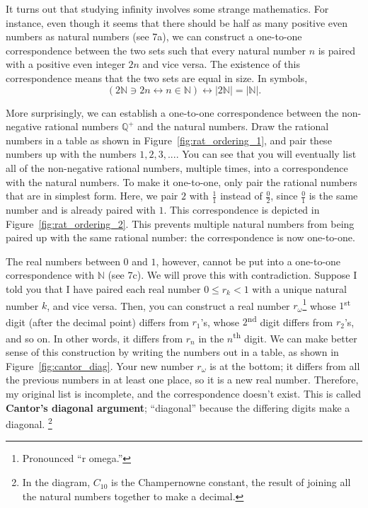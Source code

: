 \documentclass[../gatm.tex]{subfiles}
\begin{document}
It turns out that studying infinity involves some strange mathematics. For instance, even though it seems that there should be half as many positive even numbers as natural numbers (see 7a), we can construct a one-to-one correspondence between the two sets such that every natural number $n$ is paired with a positive even integer $2n$ and vice versa. The existence of this correspondence means that the two sets are equal in size. In symbols, $$(2\mathbb{N} \ni 2n \leftrightarrow n \in \mathbb{N}) \leftrightarrow |2\mathbb{N}|=|\mathbb{N}|.$$ %

More surprisingly, we can establish a one-to-one correspondence between the non-negative rational numbers $\mathbb{Q}^+$ and the natural numbers. Draw the rational numbers in a table as shown in Figure~\ref{fig:rat_ordering_1}, and pair these numbers up with the numbers $1,2,3,$.... You can see that you will eventually list all of the non-negative rational numbers, multiple times, into a correspondence with the natural numbers. To make it one-to-one, only pair the rational numbers that are in simplest form. Here, we pair $2$ with $\frac{1}{1}$ instead of $\frac{0}{2}$, since $\frac{0}{1}$ is the same number and is already paired with $1$. This correspondence is depicted in Figure~\ref{fig:rat_ordering_2}. This prevents multiple natural numbers from being paired up with the same rational number: the correspondence is now one-to-one.

The real numbers between $0$ and $1$, however, cannot be put into a one-to-one correspondence with $\mathbb{N}$ (see 7c). We will prove this with contradiction. Suppose I told you that I have paired each real number $0 \leq r_k < 1$ with a unique natural number $k$, and vice versa. Then, you can construct a real number $r_\omega$\footnote{Pronounced ``r omega.''} whose $1$\textsuperscript{st} digit (after the decimal point) differs from $r_1$’s, whose $2$\textsuperscript{nd} digit differs from $r_2$’s, and so on. In other words, it differs from $r_n$ in the $n$\textsuperscript{th} digit. We can make better sense of this construction by writing the numbers out in a table, as shown in Figure~\ref{fig:cantor_diag}. Your new number $r_\omega$ is at the bottom; it differs from all the previous numbers in at least one place, so it is a new real number. Therefore, my original list is incomplete, and the correspondence doesn’t exist. This is called \textbf{Cantor’s diagonal argument}; ``diagonal'' because the differing digits make a diagonal. \footnote{In the diagram, $C_{10}$ is the Champernowne constant, the result of joining all the natural numbers together to make a decimal.} %
\end{document}
